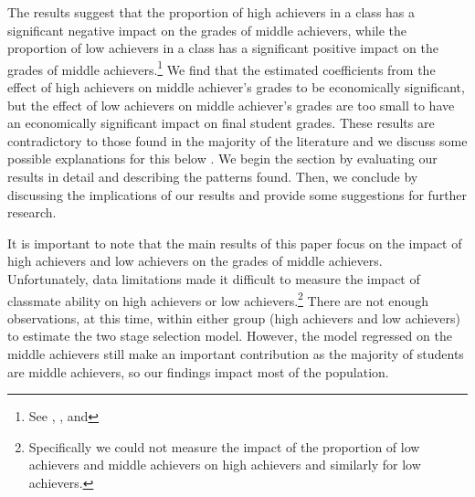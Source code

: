 The results suggest that the proportion of high achievers in a class has a significant  negative impact on the grades of middle achievers, while the proportion of low achievers in a class has a significant positive impact on the grades of middle achievers.\footnote{See , , and }
We find that the estimated coefficients from the effect of high achievers on middle achiever's grades to be economically significant, but the effect of low achievers on middle achiever's grades are too small to have an economically significant impact on final student grades.
These results are contradictory to those found in the majority of the literature and we discuss some possible explanations for this below \citep{kang2007classroom,carman2012classroom,burke2013classroom,schlosser2008inside,lavy2012good}. 
We begin the section by evaluating our results in detail and describing the patterns found.
Then, we conclude by discussing the implications of our results and provide some suggestions for further research. 


It is important to note that the main results of this paper focus on the impact of high achievers and low achievers on the grades of middle achievers. 
Unfortunately, data limitations made it difficult to measure the impact of classmate ability on high achievers or low achievers.\footnote{Specifically we could not measure the impact of the proportion of low achievers and middle achievers on high achievers and similarly for low achievers.} 
There are not enough observations, at this time, within either group (high achievers and low achievers) to estimate the two stage selection model. 
However, the model regressed on the middle achievers still make an important contribution as the majority of students are middle achievers, so our findings impact most of the population.


